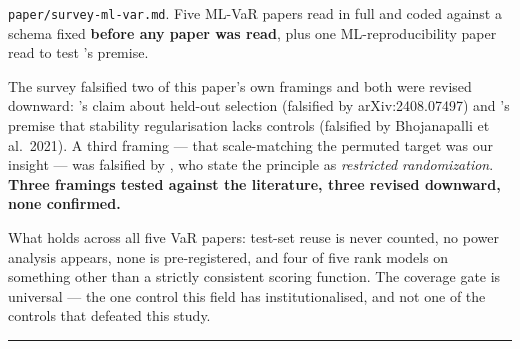 \texttt{paper/survey-ml-var.md}. Five ML-VaR papers read in full and coded against a schema fixed
\textbf{before any paper was read}, plus one ML-reproducibility paper read to test 's premise.

The survey falsified two of this paper's own framings and both were revised downward: 's claim
about held-out selection (falsified by arXiv:2408.07497) and 's premise that stability
regularisation lacks controls (falsified by Bhojanapalli et al.~2021). A third framing --- that
scale-matching the permuted target was our insight --- was falsified by \citet{ojala2010permutation},
who state the principle as \emph{restricted randomization}. \textbf{Three framings tested against the
literature, three revised downward, none confirmed.}

What holds across all five VaR papers: test-set reuse is never counted, no power analysis
appears, none is pre-registered, and four of five rank models on something other than a strictly
consistent scoring function. The coverage gate is universal --- the one control this field has
institutionalised, and not one of the controls that defeated this study.

\begin{center}\rule{0.5\linewidth}{0.5pt}\end{center}
